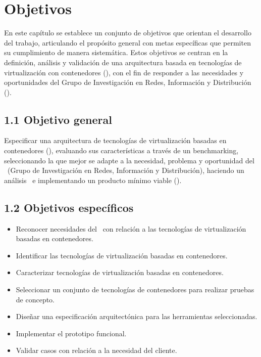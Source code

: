 \chapter*{Objetivos}
\label{cap:objetivos}

En este capítulo se establece un conjunto de objetivos que orientan el desarrollo del trabajo, articulando el propósito general con metas específicas que permiten su cumplimiento de manera sistemática. Estos objetivos se centran en la definición, análisis y validación de una arquitectura basada en tecnologías de virtualización con contenedores (\VBC), con el fin de responder a las necesidades y oportunidades del Grupo de Investigación en Redes, Información y Distribución (\GRID). 

\section*{1.1 Objetivo general}
\label{cap:objetivoGeneral}

Especificar una arquitectura de tecnologías de virtualización basadas en contenedores (\VBC), evaluando sus características a través de un benchmarking, seleccionando la que mejor se adapte a la necesidad, problema y oportunidad del \GRID\ (Grupo de Investigación en Redes, Información y Distribución), haciendo un análisis \DAR\ e implementando un producto mínimo viable (\PMV).

\section*{1.2 Objetivos específicos}
\label{cap:objetivosEspecificos}
\begin{itemize}
    \item Reconocer necesidades del \GRID\ con relación a las tecnologías de virtualización basadas en contenedores.
    \item Identificar las tecnologías de virtualización basadas en contenedores.
    \item Caracterizar tecnologías de virtualización basadas en contenedores.
    \item Seleccionar un conjunto de tecnologías de contenedores para realizar pruebas de concepto.
    \item Diseñar una especificación arquitectónica para las herramientas seleccionadas.
    \item Implementar el prototipo funcional.
    \item Validar casos con relación a la necesidad del cliente.
\end{itemize}